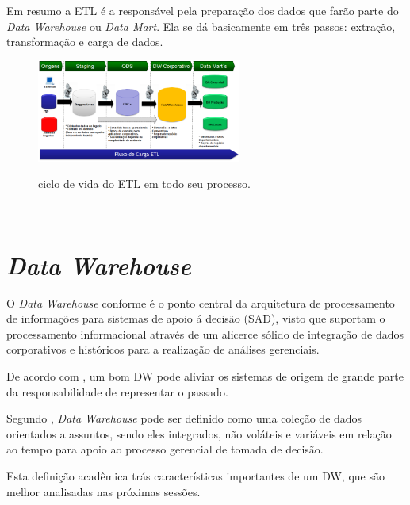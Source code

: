 Em resumo a ETL \'{e} a respons\'{a}vel pela prepara\c{c}\~{a}o dos dados que far\~{a}o parte
do \textit{Data Warehouse} ou \textit{Data Mart}. Ela se d\'{a} basicamente em três passos: extra\c{c}\~{a}o, transforma\c{c}\~{a}o e carga de dados.

\begin{figure}[H]
	\vspace*{0,2cm}
    \centering
    \caption{ciclo de vida do ETL em todo seu processo.}
    \includegraphics[width=0.6\textwidth]{./04-figuras/figura-05}
    \label{fig:ilustfig05}
\end{figure}
\vspace*{-0,9cm}
{\raggedright {}}\\

\section{\textit{Data Warehouse}}

O \textit{Data Warehouse} conforme \cite{si-inmon-1997} \'{e} o ponto central da arquitetura de processamento de informa\c{c}\~{o}es para sistemas de apoio \'{a} decis\~{a}o (SAD), visto que suportam o processamento informacional atrav\'{e}s de um alicerce s\'{o}lido de integra\c{c}\~{a}o de dados corporativos e hist\'{o}ricos para a realiza\c{c}\~{a}o de an\'{a}lises gerenciais.

De acordo com \cite{dw-kimball-2013}, um bom DW pode aliviar os sistemas de origem de grande parte da responsabilidade de representar o passado.

Segundo \cite{si-inmon-1997}, \textit{Data Warehouse} pode ser definido como uma cole\c{c}\~{a}o de dados orientados a assuntos, sendo eles integrados, n\~{a}o vol\'{a}teis e vari\'{a}veis em rela\c{c}\~{a}o ao tempo para apoio ao processo gerencial de tomada de decis\~{a}o.

Esta defini\c{c}\~{a}o acadêmica tr\'{a}s caracter\'{i}sticas importantes de um DW, que s\~{a}o melhor analisadas nas pr\'{o}ximas sess\~{o}es.


